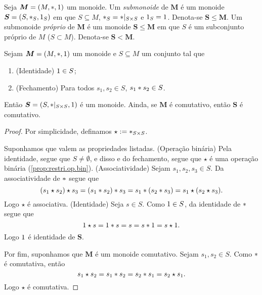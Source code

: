 \begin{definition}
Seja $\bm M=(M,\ast,1)$ um monoide. Um \emph{submonoide} de $\bm M$ é um monoide $\bm S=(S,\ast _S,1_S)$ em que $S \subseteq M$, $\ast _S= \ast |_{S \times S}$ e $1_S=1$. Denota-se $\bm S \leq \bm M$. Um submonoide \emph{próprio} de $\bm M$ é um monoide $\bm S \leq \bm M$ em que $S$ é um subconjunto próprio de $M$ ($S \subset M$). Denota-se $\bm S < \bm M$.
\end{definition}

\begin{proposition}
\label{alge:prop.submon}
Sejam $\bm M=(M,\ast,1)$ um monoide e $S \subseteq M$ um conjunto tal que
	\begin{enumerate}[label=\textbf{SM\arabic*.},ref={SM\arabic*}]
	\item \label{SM1} (Identidade) $1 \in S$;
	\item \label{SM2} (Fechamento) Para todos $s_1,s_2 \in S$, $s_1 \ast s_2 \in S$.
	\end{enumerate}
\noindent
Então $\bm S=(S,\ast|_{S \times S},1)$ é um monoide. Ainda, se $\bm M$ é comutativo, então $\bm S$ é comutativo.
\end{proposition}
\begin{proof} Por simplicidade, definamos $\star :=  \ast _{S \times S}$.


Suponhamos que valem as propriedades listadas. (Operação binária) Pela identidade, segue que $S \neq \emptyset$, e disso e do fechamento, segue que $\star$ é uma operação binária (\ref{prop:restri.op.bin}).
(Associatividade) Sejam $s_1,s_2,s_3 \in S$. Da associatividade de $ \ast $ segue que
	\begin{equation*}
	 (s_1 \star s_2) \star s_3 = (s_1 \ast s_2) \ast s_3 = s_1 \ast (s_2  \ast  s_3) = s_1 \star (s_2 \star s_3).
	 \end{equation*}
Logo $\star$ é associativa. (Identidade) Seja $s \in S$. Como $1 \in S$, da identidade de $ \ast $ segue que
	\begin{equation*}
	1 \star s = 1 \ast s = s = s \ast 1 = s \star 1.
	\end{equation*}
Logo $1$ é identidade de $\bm S$.

Por fim, suponhamos que $\bm M$ é um monoide comutativo. Sejam $s_1,s_2 \in S$. Como $ \ast $ é comutativa, então
	\begin{equation*}
	s_1 \star s_2 = s_1 \ast s_2 = s_2 \ast s_1 = s_2 \star s_1.
	\end{equation*}
Logo $\star$ é comutativa.
\end{proof}


